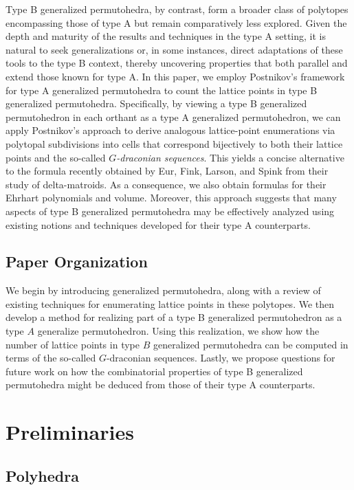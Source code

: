 \documentclass[12pt,reqno]{article}%
\theoremstyle{definition}
\numberwithin{equation}{section}
\begin{document}
Type B generalized permutohedra, by contrast, form a broader class of polytopes encompassing those of type A but remain comparatively less explored. Given the depth and maturity of the results and techniques in the type A setting, it is natural to seek generalizations or, in some instances, direct adaptations of these tools to the type B context, thereby uncovering properties that both parallel and extend those known for type A. In this paper, we employ Postnikov’s framework \cite{Postnikov2005} for type A generalized permutohedra to count the lattice points in type B generalized permutohedra. Specifically, by viewing a type B generalized permutohedron in each orthant as a type A generalized permutohedron, we can apply Postnikov's approach to derive analogous lattice-point enumerations via polytopal subdivisions into cells that correspond bijectively to both their lattice points and the so-called \emph{$G$-draconian sequences}. This yields a concise alternative to the formula recently obtained by Eur, Fink, Larson, and Spink \cite[Theorem A]{Euretall2024} from their study of delta-matroids. As a consequence, we also obtain formulas for their Ehrhart polynomials and volume. Moreover, this approach suggests that many aspects of type B generalized permutohedra may be effectively analyzed using existing notions and techniques developed for their type A counterparts.

\subsection*{Paper Organization} We begin by introducing  generalized permutohedra, along with a review of existing techniques for enumerating lattice points in these polytopes. We then develop a method for realizing part of a type B generalized permutohedron as a type $A$ generalize permutohedron. Using this realization, we show how the number of lattice points in type $B$ generalized permutohedra can be computed in terms of the so-called $G$-draconian sequences. Lastly, we propose questions for future work on how the combinatorial properties of type B generalized permutohedra might be deduced from those of their type A counterparts.  

\section{Preliminaries}
\subsection{Polyhedra}
\end{document}
